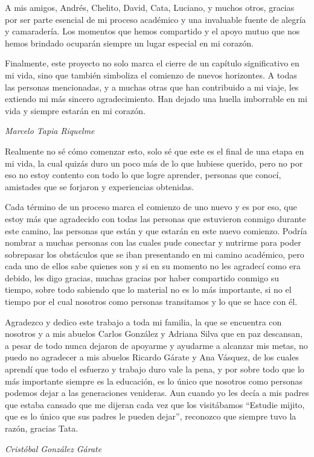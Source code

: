 A mis amigos, Andrés, Chelito, David, Cata, Luciano, y muchos otros, gracias por ser parte esencial de mi proceso académico y una invaluable fuente de alegría y camaradería. Los momentos que hemos compartido y el apoyo mutuo que nos hemos brindado ocuparán siempre un lugar especial en mi corazón.

Finalmente, este proyecto no solo marca el cierre de un capítulo significativo en mi vida, sino que también simboliza el comienzo de nuevos horizontes. A todas las personas mencionadas, y a muchas otras que han contribuido a mi viaje, les extiendo mi más sincero agradecimiento. Han dejado una huella imborrable en mi vida y siempre estarán en mi corazón.

\textit{Marcelo Tapia Riquelme}

\vspace{2cm}

\newpage
Realmente no sé cómo comenzar esto, solo sé que este es el final de una etapa en mi vida, la cual quizás duro un poco más de lo que hubiese querido, pero no por eso no estoy contento con todo lo que logre aprender, personas que conocí, amistades que se forjaron y experiencias obtenidas.

Cada término de un proceso marca el comienzo de uno nuevo y es por eso, que estoy más que agradecido con todas las personas que estuvieron conmigo durante este camino, las personas que están y que estarán en este nuevo comienzo. Podría nombrar a muchas personas con las cuales pude conectar y nutrirme para poder sobrepasar los obstáculos que se iban presentando en mi camino académico, pero cada uno de ellos sabe quienes son y si en su momento no les agradecí como era debido, les digo gracias, muchas gracias por haber compartido conmigo su tiempo, sobre todo sabiendo que lo material no es lo más importante, si no el tiempo por el cual nosotros como personas transitamos y lo que se hace con él.

Agradezco y dedico este trabajo a toda mi familia, la que se encuentra con nosotros y a mis abuelos Carlos González y Adriana Silva que en paz descansan, a pesar de todo nunca dejaron de apoyarme y ayudarme a alcanzar mis metas, no puedo no agradecer a mis abuelos Ricardo Gárate y Ana Vásquez, de los cuales aprendí que todo el esfuerzo y trabajo duro vale la pena, y por sobre todo que lo más importante siempre es la educación, es lo único que nosotros como personas podemos dejar a las generaciones venideras. Aun cuando yo les decía a mis padres que estaba cansado que me dijeran cada vez que los visitábamos “Estudie mijito, que es lo único que sus padres le pueden dejar”, reconozco que siempre tuvo la razón, gracias Tata.

\textit{Cristóbal González Gárate}